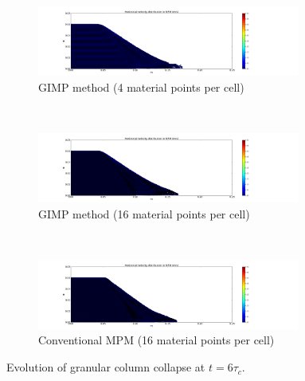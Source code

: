 \begin{figure}[tbhp]
	\centering
	\begin{subfigure}[b]{0.95\textwidth}
		\centering
		\includegraphics[width=0.95\textwidth]{4GIMPM_6tc}
		\caption{GIMP method (4 material points per cell)}
		\label{fig:4GIMPM_6tc}
	\end{subfigure} \\
	\begin{subfigure}[b]{0.95\textwidth}
		\centering
		\includegraphics[width=0.95\textwidth]{16GIMPM_6tc}
		\caption{GIMP method (16 material points per cell)}
		\label{fig:16GIMPM_6tc}
	\end{subfigure} \\
	\begin{subfigure}[b]{0.95\textwidth}
		\centering
		\includegraphics[width=0.95\textwidth]{16MPM_6tc}
		\caption{Conventional MPM (16 material points per cell)}
		\label{fig:16MPM_6tc}
	\end{subfigure}
	\caption{Evolution of granular column collapse at $t = 6\tau_c$.}
	\label{fig:MPM_GIMP_6TC}
\end{figure} 

